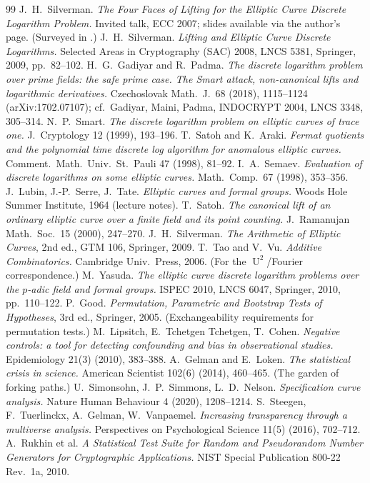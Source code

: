 \documentclass[11pt]{article}
\theoremstyle{definition}
\DeclareMathOperator{\Uk}{U}
\begin{document}
\begin{thebibliography}{99}
 J.~H.~Silverman. \emph{The Four Faces of
Lifting for the Elliptic Curve Discrete Logarithm Problem.} Invited talk,
ECC 2007; slides available via the author's page. (Surveyed in
\cite{silvermanlift}.)
 J.~H.~Silverman. \emph{Lifting and Elliptic Curve
Discrete Logarithms.} Selected Areas in Cryptography (SAC) 2008, LNCS
5381, Springer, 2009, pp.\ 82--102.
 H.~G.~Gadiyar and R.~Padma. \emph{The discrete
logarithm problem over prime fields: the safe prime case. The Smart
attack, non-canonical lifts and logarithmic derivatives.} Czechoslovak Math.\ J.\ 68 (2018),
1115--1124 (arXiv:1702.07107); cf.\ Gadiyar, Maini, Padma, INDOCRYPT 2004,
LNCS 3348, 305--314.
 N.~P.~Smart. \emph{The discrete logarithm problem on
elliptic curves of trace one.} J.~Cryptology 12 (1999), 193--196.
 T.~Satoh and K.~Araki. \emph{Fermat quotients and
the polynomial time discrete log algorithm for anomalous elliptic
curves.} Comment.\ Math.\ Univ.\ St.\ Pauli 47 (1998), 81--92.
 I.~A.~Semaev. \emph{Evaluation of discrete logarithms on
some elliptic curves.} Math.\ Comp.\ 67 (1998), 353--356.
 J.~Lubin, J.-P.~Serre, J.~Tate. \emph{Elliptic curves and
formal groups.} Woods Hole Summer Institute, 1964 (lecture notes).
 T.~Satoh. \emph{The canonical lift of an ordinary
elliptic curve over a finite field and its point counting.} J.~Ramanujan
Math.\ Soc.\ 15 (2000), 247--270.
 J.~H.~Silverman. \emph{The Arithmetic of Elliptic
Curves}, 2nd ed., GTM 106, Springer, 2009.
 T.~Tao and V.~Vu. \emph{Additive Combinatorics.}
Cambridge Univ.\ Press, 2006. (For the $\Uk^2$/Fourier correspondence.)
 M.~Yasuda. \emph{The elliptic curve discrete logarithm
problems over the $p$-adic field and formal groups.} ISPEC 2010, LNCS
6047, Springer, 2010, pp.\ 110--122.
 P.~Good. \emph{Permutation, Parametric and Bootstrap
Tests of Hypotheses}, 3rd ed., Springer, 2005. (Exchangeability
requirements for permutation tests.)
 M.~Lipsitch, E.~Tchetgen Tchetgen, T.~Cohen.
\emph{Negative controls: a tool for detecting confounding and bias in
observational studies.} Epidemiology 21(3) (2010), 383--388.
 A.~Gelman and E.~Loken. \emph{The statistical
crisis in science.} American Scientist 102(6) (2014), 460--465. (The
garden of forking paths.)
 U.~Simonsohn, J.~P.~Simmons, L.~D.~Nelson.
\emph{Specification curve analysis.} Nature Human Behaviour 4 (2020),
1208--1214.
 S.~Steegen, F.~Tuerlinckx, A.~Gelman, W.~Vanpaemel.
\emph{Increasing transparency through a multiverse analysis.}
Perspectives on Psychological Science 11(5) (2016), 702--712.
 A.~Rukhin et al. \emph{A Statistical Test Suite for
Random and Pseudorandom Number Generators for Cryptographic
Applications.} NIST Special Publication 800-22 Rev.\ 1a, 2010.
\end{thebibliography}
\end{document}
